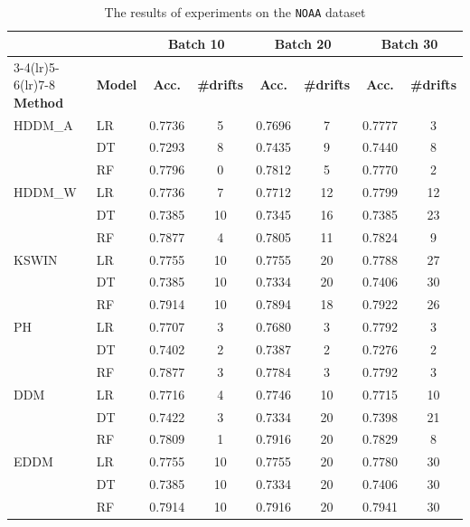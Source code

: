 \begin{table}[h]
    \centering
    \scriptsize
    \caption{The results of experiments on the \texttt{NOAA} dataset}
    \label{tab:exp_NOAA}
    \begin{tabular}{llcccccc}\toprule
         & & \multicolumn{2}{c}{Batch 10} & \multicolumn{2}{c}{Batch 20} & \multicolumn{2}{c}{Batch 30} \\\cmidrule(lr){3-4}\cmidrule(lr){5-6}\cmidrule(lr){7-8}
         \textbf{Method} & \textbf{Model} & \textbf{Acc.} & \textbf{\#drifts} & \textbf{Acc.} & \textbf{\#drifts} & \textbf{Acc.} & \textbf{\#drifts} \\\midrule
    HDDM\_A  & LR & 0.7736 & 5 & 0.7696 & 7 & 0.7777 & 3 \\
             & DT & 0.7293 & 8 & 0.7435 & 9 & 0.7440 & 8 \\
             & RF & 0.7796 & 0 & 0.7812 & 5 & 0.7770 & 2 \\
    \midrule
    HDDM\_W  & LR & 0.7736 & 7 & 0.7712 & 12 & 0.7799 & 12 \\
             & DT & 0.7385 & 10 & 0.7345 & 16 & 0.7385 & 23 \\
             & RF & 0.7877 & 4 & 0.7805 & 11 & 0.7824 & 9 \\
    \midrule
    KSWIN    & LR & 0.7755 & 10 & 0.7755 & 20 & 0.7788 & 27 \\
             & DT & 0.7385 & 10 & 0.7334 & 20 & 0.7406 & 30 \\
             & RF & 0.7914 & 10 & 0.7894 & 18 & 0.7922 & 26 \\
    \midrule
    PH       & LR & 0.7707 & 3 & 0.7680 & 3 & 0.7792 & 3 \\
             & DT & 0.7402 & 2 & 0.7387 & 2 & 0.7276 & 2 \\
             & RF & 0.7877 & 3 & 0.7784 & 3 & 0.7792 & 3 \\
    \midrule
    DDM      & LR & 0.7716 & 4 & 0.7746 & 10 & 0.7715 & 10 \\
             & DT & 0.7422 & 3 & 0.7334 & 20 & 0.7398 & 21 \\
             & RF & 0.7809 & 1 & 0.7916 & 20 & 0.7829 & 8 \\
    \midrule
    EDDM     & LR & 0.7755 & 10 & 0.7755 & 20 & 0.7780 & 30 \\
             & DT & 0.7385 & 10 & 0.7334 & 20 & 0.7406 & 30 \\
             & RF & 0.7914 & 10 & 0.7916 & 20 & 0.7941 & 30 \\

\end{tabular}
\end{table}
